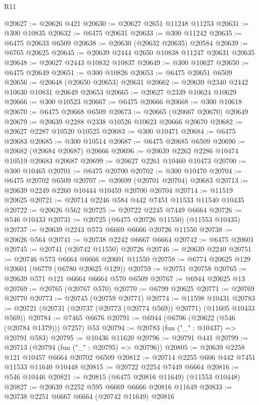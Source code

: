 \begin{lexlean}{R11}
\begin{coremodule}
@20627 := @20626 @421
@20630 := @20627 @2651 @11248 @11253
@20631 := @300 @10835
@20632 := @6475 @20631
@20633 := @300 @11242
@20635 := @6475 @20633 @6509
@20638 := @20630 (@20632 @20635) @20584
@20639 := @6765 @20625
@20645 := @20639 @2444 @2650 @10838 @11247 @20631 @20635
@20648 := @20627 @2443 @10832 @10837
@20649 := @300 @10627
@20650 := @6475 @20649
@20651 := @300 @10826
@20653 := @6475 @20651 @6509
@20656 := @20648 (@20650 @20653) @20631
@20662 := @20639 @2340 @2442 @10630 @10831 @20649 @20653
@20665 := @20627 @2339 @10624 @10629
@20666 := @300 @10523
@20667 := @6475 @20666
@20668 := @300 @10618
@20670 := @6475 @20668 @6509
@20673 := @20665 (@20667 @20670) @20649
@20679 := @20639 @2288 @2338 @10526 @10623 @20666 @20670
@20682 := @20627 @2287 @10520 @10525
@20683 := @300 @10471
@20684 := @6475 @20683
@20685 := @300 @10514
@20687 := @6475 @20685 @6509
@20690 := @20682 (@20684 @20687) @20666
@20696 := @20639 @2262 @2286 @10474 @10519 @20683 @20687
@20699 := @20627 @2261 @10460 @10473
@20700 := @300 @10465
@20701 := @6475 @20700
@20702 := @300 @10470
@20704 := @6475 @20702 @6509
@20707 := @20699 (@20701 @20704) @20683
@20713 := @20639 @2249 @2260 @10444 @10459 @20700 @20704
@20714 := @11519 @20625
@20721 := @20714 @2246 @584 @442 @7451 @11533 @11540 @10435
@20722 := @20626 @562
@20725 := @20722 @2245 @7449 @6664
@20726 := @546 @10433
@20731 := @20725 (@6475 @20726 @11550) (@11553 @10435)
@20737 := @20639 @2243 @573 @6669 @6666 @20726 @11550
@20738 := @20626 @564
@20741 := @20738 @2242 @6667 @6664
@20742 := @6475 @20601
@20745 := @20741 (@20742 @11550) @20726
@20746 := @20639 @2240
@20751 := @20746 @573 @6664 @6666 @20601 @11550
@20758 := @6774 @20625 @129 @20601 (@6779 (@6780 @20625 @129))
@20759 := @20751 @20758
@20765 := @20639 @571 @121 @6664 @6664 @570 @6509
@20767 := @6944 @20625 @13
@20769 := @20765 (@20767 @570)
@20770 := @6799 @20625
@20771 := @20769 @20770
@20773 := @20745 (@20759 @20771)
@20774 := @11598 @10431
@20783 := @20721 (@20731 (@20737 (@20773 (@20774 @569)) @20771) (@11605 @10433 @569))
@20784 := @7465 @6676
@20791 := @6944 (@6706 (@20622 (@546 (@20784 @1379))) @7257) @53
@20794 := @20783 (fun ("_" : @10437) => @20791 @583)
@20795 := @10436 @11620
@20796 := @20791 @441
@20799 := @20713 (@20794 (fun ("_" : @20795) => @20796))
@20805 := @20639 @2258 @121 @10457 @6664 @20702 @6509
@20812 := @20714 @2255 @606 @442 @7451 @11533 @11640 @10448
@20815 := @20722 @2254 @7449 @6664
@20816 := @546 @10446
@20821 := @20815 (@6475 @20816 @11649) (@11553 @10448)
@20827 := @20639 @2252 @595 @6669 @6666 @20816 @11649
@20833 := @20738 @2251 @6667 @6664 (@20742 @11649) @20816

\end{coremodule}
\end{lexlean}
